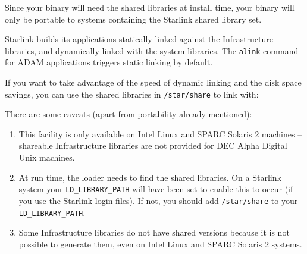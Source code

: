 \documentclass[twoside,11pt,nolof]{starlink}
\begin{document}
Since your binary will need the shared libraries at install time, your
binary will only be portable to systems containing the Starlink shared
library set.

Starlink builds its applications statically linked against the
Infrastructure libraries, and dynamically linked with the system
libraries.  The \texttt{alink} command for ADAM applications triggers static
linking by default.

If you want to take advantage of the speed of dynamic linking and the
disk space savings, you can use the shared libraries in \texttt{/star/share}
to link with:

\begin{terminalv}
\end{terminalv}

There are some caveats (apart from portability already mentioned):

\begin{enumerate}

\item This facility is only available on Intel Linux and SPARC Solaris
2 machines -- shareable Infrastructure libraries are not provided for
DEC Alpha Digital Unix machines.

\item At run time, the loader needs to find the shared libraries.  On a
Starlink system your \texttt{LD\_LIBRARY\_PATH} will have been set to enable
this to occur (if you use the Starlink login files).  If not, you should
add \texttt{/star/share} to your \texttt{LD\_LIBRARY\_PATH}.

\item Some Infrastructure libraries do not have shared versions because
it is not possible to generate them, even on Intel Linux and SPARC Solaris 2
systems.

\end{enumerate}
\end{document}
